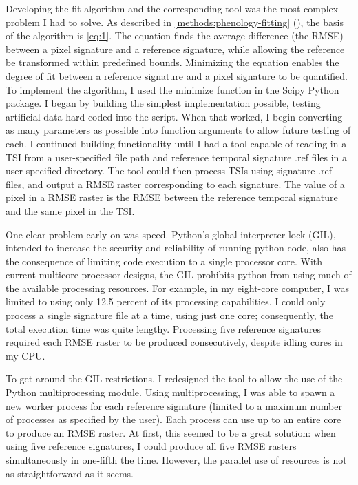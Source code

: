 Developing the fit algorithm and the corresponding tool was the most complex problem I had to solve. As described in \autoref{methods:phenology-fitting} (), the basis of the algorithm is \autoref{eq:1}. The equation finds the average difference (the RMSE) between a pixel signature and a reference signature, while allowing the reference be transformed within predefined bounds. Minimizing the equation enables the degree of fit between a reference signature and a pixel signature to be quantified. To implement the algorithm, I used the minimize function in the Scipy Python package. I began by building the simplest implementation possible, testing artificial data hard-coded into the script. When that worked, I begin converting as many parameters as possible into function arguments to allow future testing of each. I continued building functionality until I had a tool capable of reading in a TSI from a user-specified file path and reference temporal signature .ref files in a user-specified directory. The tool could then process TSIs using signature .ref files, and output a RMSE raster corresponding to each signature. The value of a pixel in a RMSE raster is the RMSE between the reference temporal signature and the same pixel in the TSI.

One clear problem early on was speed. Python’s global interpreter lock (GIL), intended to increase the security and reliability of running python code, also has the consequence of limiting code execution to a single processor core. With current multicore processor designs, the GIL prohibits python from using much of the available processing resources. For example, in my eight-core computer, I was limited to using only 12.5 percent of its processing capabilities. I could only process a single signature file at a time, using just one core; consequently, the total execution time was quite lengthy. Processing five reference signatures required each RMSE raster to be produced consecutively, despite idling cores in my CPU.

To get around the GIL restrictions, I redesigned the tool to allow the use of the Python multiprocessing module. Using multiprocessing, I was able to spawn a new worker process for each reference signature (limited to a maximum number of processes as specified by the user). Each process can use up to an entire core to produce an RMSE raster. At first, this seemed to be a great solution: when using five reference signatures, I could produce all five RMSE rasters simultaneously in one-fifth the time. However, the parallel use of resources is not as straightforward as it seems.

